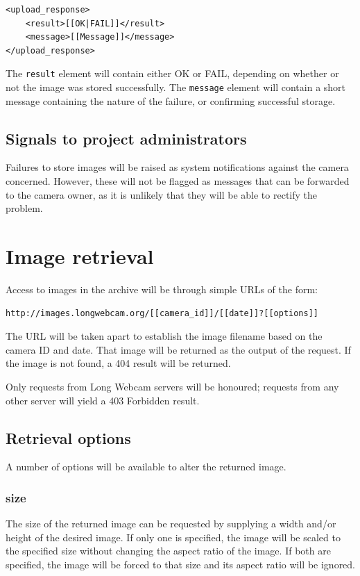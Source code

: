 \documentclass[11pt]{article}
\begin{document}
\begin{verbatim}
<upload_response>
    <result>[[OK|FAIL]]</result>
    <message>[[Message]]</message>
</upload_response>
\end{verbatim}

The \verb+result+ element will contain either OK or FAIL, depending on whether or not the image was stored successfully. The \verb+message+ element will contain a short message containing the nature of the failure, or confirming successful storage.

\subsection{Signals to project administrators}
Failures to store images will be raised as system notifications against the camera concerned. However, these will not be flagged as messages that can be forwarded to the camera owner, as it is unlikely that they will be able to rectify the problem.

\section{Image retrieval}
Access to images in the archive will be through simple URLs of the form:

\begin{verbatim}
http://images.longwebcam.org/[[camera_id]]/[[date]]?[[options]]
\end{verbatim}

The URL will be taken apart to establish the image filename based on the camera ID and date. That image will be returned as the output of the request. If the image is not found, a 404 result will be returned.

Only requests from Long Webcam servers will be honoured; requests from any other server will yield a 403 Forbidden result.

\subsection{Retrieval options}
A number of options will be available to alter the returned image.

\subsubsection{size}
The size of the returned image can be requested by supplying a width and/or height of the desired image. If only one is specified, the image will be scaled to the specified size without changing the aspect ratio of the image. If both are specified, the image will be forced to that size and its aspect ratio will be ignored.
\end{document}
